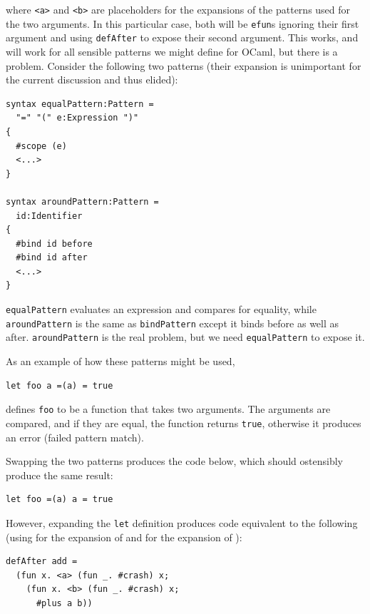 \documentclass{kththesis}
\begin{document}
where \texttt{<a>} and \texttt{<b>} are placeholders for the expansions of the patterns used for the two arguments. In this particular case, both will be \texttt{efun}s ignoring their first argument and using \texttt{defAfter} to expose their second argument. This works, and will work for all sensible patterns we might define for OCaml, but there is a problem. Consider the following two patterns (their expansion is unimportant for the current discussion and thus elided):

\begin{verbatim}
syntax equalPattern:Pattern =
  "=" "(" e:Expression ")"
{
  #scope (e)
  <...>
}

syntax aroundPattern:Pattern =
  id:Identifier
{
  #bind id before
  #bind id after
  <...>
}
\end{verbatim}

\texttt{equalPattern} evaluates an expression and compares for equality, while \texttt{aroundPattern} is the same as \texttt{bindPattern} except it binds before as well as after. \texttt{aroundPattern} is the real problem, but we need \texttt{equalPattern} to expose it.

As an example of how these patterns might be used,

\begin{verbatim}
let foo a =(a) = true
\end{verbatim}

defines \texttt{foo} to be a function that takes two arguments. The arguments are compared, and if they are equal, the function returns \texttt{true}, otherwise it produces an error (failed pattern match).

Swapping the two patterns produces the code below, which should ostensibly produce the same result:

\begin{verbatim}
let foo =(a) a = true
\end{verbatim}

However, expanding the \texttt{let} definition produces code equivalent to the following (using  for the expansion of  and  for the expansion of ):

\begin{verbatim}
defAfter add =
  (fun x. <a> (fun _. #crash) x;
    (fun x. <b> (fun _. #crash) x;
      #plus a b))
\end{verbatim}
\end{document}

